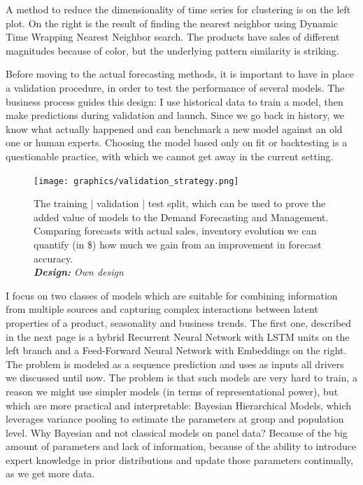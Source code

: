 \documentclass[12pt]{article}
\begin{document}
A method to reduce the dimensionality of time series for clustering is on the left plot. On the right is the result of finding the nearest neighbor using Dynamic Time Wrapping Nearest Neighbor search. The products have sales of different magnitudes because of color, but the underlying pattern similarity is striking. 


Before moving to the actual forecasting methods, it is important to have in place a validation procedure, in order to test the performance of several models. The business process guides this design: I use historical data to train a model, then make predictions during validation and launch. Since we go back in history, we know what actually happened and can benchmark a new model against an old one or human experts. Choosing the model based only on fit or backtesting is a questionable practice, with which we cannot get away in the current setting.

\begin{figure}[!ht]
	\centering
	\texttt{[image: graphics/validation\_strategy.png]}%
	\caption{The training | validation | test split, which can be used to prove the added value of models to the Demand Forecasting and Management. Comparing forecasts with actual sales, inventory evolution we can quantify (in \$) how much we gain from an improvement in forecast accuracy. \\
		\textit{\textbf{Design:} Own design}}
\end{figure}

I focus on two classes of models which are suitable for combining information from multiple sources and capturing complex interactions between latent properties of a product, seasonality and business trends. The first one, described in the next page is a hybrid Recurrent Neural Network with LSTM units on the left branch and a Feed-Forward Neural Network with Embeddings on the right. The problem is modeled as a sequence prediction and uses as inputs all drivers we discussed until now. The problem is that such models are very hard to train, a reason we might use simpler models (in terms of representational power), but which are more practical and interpretable: Bayesian Hierarchical Models, which leverages variance pooling to estimate the parameters at group and population level. Why Bayesian and not classical models on panel data? Because of the big amount of parameters and lack of information, because of the ability to introduce expert knowledge in prior distributions and update those parameters continually, as we get more data.
\end{document}
